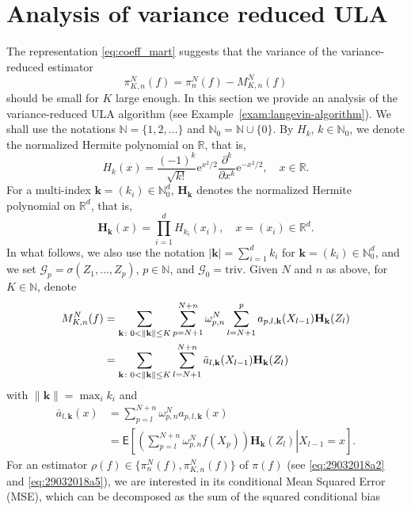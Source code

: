 \documentclass[aap,preprint]{imsart}
\def\rme{\mathrm{e}}
\begin{document}
\section{Analysis of variance reduced ULA}
\label{sec:ula_analysis}
The representation \eqref{eq:coeff_mart} suggests that the variance of  the  variance-reduced estimator
\begin{equation}
\label{eq:29032018a3}
\pi_{K,n}^N(f)=\pi_n^N(f)-M_{K,n}^N(f)
\end{equation}
should be small for \(K\) large enough. In this section   we provide  an analysis of the variance-reduced ULA  algorithm (see Example~\ref{exam:langevin-algorithm}).
We shall use the notations $\mathbb N=\{1,2,\ldots\}$ and $\mathbb N_0=\mathbb N\cup\{0\}$.
By $H_k$, $k\in\mathbb N_0$,
we denote the normalized Hermite polynomial on $\mathbb R$, that is,
$$
H_k(x)=\frac{(-1)^k}{\sqrt{k!}}\rme^{x^2/2}\frac{\partial^k}{\partial x^k}\rme^{-x^2/2},
\quad x\in\mathbb R.
$$
For a multi-index $\mathbf{k}=(k_i)\in\mathbb N_0^d$,
$\mathbf{H}_\mathbf{k}$ denotes the normalized Hermite polynomial on $\mathbb R^d$, that is,
$$
\mathbf{H}_\mathbf{k}(x)=\prod_{i=1}^d H_{k_i}(x_i),\quad x=(x_i)\in\mathbb R^d.
$$
In what follows, we also use the notation
$|\mathbf{k}|=\sum_{i=1}^d k_i$ for $\mathbf{k}=(k_i)\in\mathbb N_0^d$,
and we set $\mathcal G_p=\sigma(Z_1,\ldots,Z_p)$, $p\in\mathbb N$, and $\mathcal G_0=\mathrm{triv}$.
Given $N$ and $n$ as above, for $K\in\mathbb N$, denote
\begin{align}
M_{K,n}^N(f) & =\sum_{\mathbf k\colon 0<\|\mathbf{k}\|\le K}\sum_{p=N+1}^{N+n}\omega_{p,n}^{N}\sum_{l=N+1}^{p}a_{p,l,\mathbf{k}}(X_{l-1})\mathbf{H}_\mathbf{k}(Z_{l})
\label{eq:29032018a5}\\
&=\sum_{\mathbf k\colon 0<\|\mathbf{k}\|\le K}\sum_{l=N+1}^{N+n}\bar{a}_{l,\mathbf{k}}(X_{l-1})\mathbf{H}_\mathbf{k}(Z_{l})
\notag
\end{align}
with \(\|\mathbf{k}\|=\max_{i} k_i\) and
\begin{align*}
\bar{a}_{l,\mathbf{k}}(x)
& =\sum_{p=l}^{N+n}\omega_{p,n}^{N}a_{p,l,\mathbf{k}}(x)\\
& =\mathsf{E}\left[\left.\left(\sum_{p=l}^{N+n}\omega_{p,n}^{N}f(X_{p})\right)\mathbf{H}_\mathbf{k}\left(Z_{l}\right)\right|X_{l-1}=x\right].
\end{align*}
For an estimator $\rho(f)\in\{\pi_n^N(f),\pi_{K,n}^N(f)\}$
of $\pi(f)$ (see \eqref{eq:29032018a2} and \eqref{eq:29032018a5}), we are interested in its conditional
Mean Squared Error (MSE),
which can be decomposed as the sum of the squared conditional bias
\end{document}
